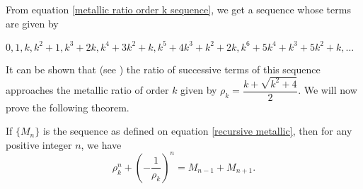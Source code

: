 \documentclass{rmutt-seminar}
\begin{document}
From equation \eqref{metallic ratio order k sequence}, we get a sequence whose terms are given by 
\begin{center}
	$0,1,k,k^2 + 1,k^3 + 2k,k^4 + 3k^2 + k, k^5 + 4k^3 + k^2 + 2k, k^6 + 5k^4 +k^3 + 5k^2 + k,\ldots$ 
\end{center}

It can be shown that (see \cite{R20}) the ratio of successive terms of this sequence approaches the metallic ratio of order $k$ given by $\rho_k = \dfrac{k+\sqrt{k^2+4}}{2}$. We 
will now prove the following theorem.
\begin{theorem}\label{metallic ratio theorem}
If $\bigl\{ M_n \bigr\}$ is the sequence as defined on equation \eqref{recursive metallic}, then for any positive integer $ n $, we have
\begin{equation}\label{metallic ratio recursive}
	 \rho_k ^n + \left(-\frac{1}{\rho_k }\right)^n = M_{n-1} + M_{n+1}. 
\end{equation}
\end{theorem}
\end{document}
